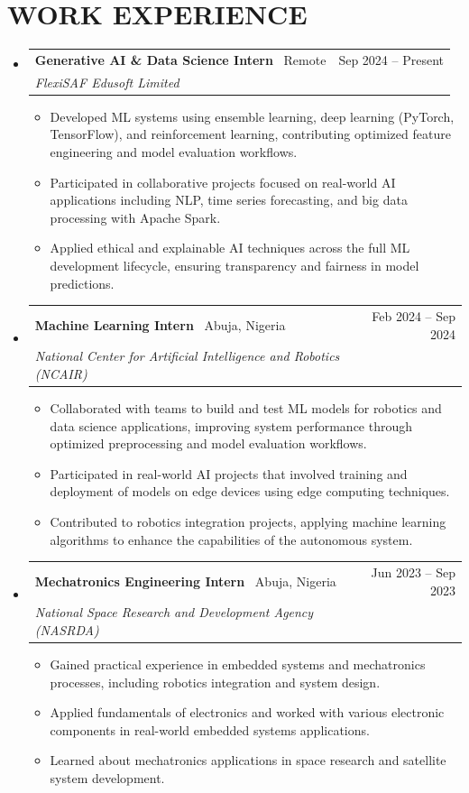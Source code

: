 \documentclass[11pt,a4paper]{article}
\makeatletter
\newcommand{\resumeSubheading}[5]{
  \vspace{2pt}
  \item[]
    \begin{tabular*}{\textwidth}[t]{l@{\extracolsep{\fill}}r}
      \textbf{#1} \textnormal{ \textbar\ #4} & #2 \\ %
      \textit{#3} & \\ %
    \end{tabular*}
    #5
  \vspace{-8pt}
}
\makeatother
\begin{document}
\vspace{-8pt}

\section{WORK EXPERIENCE}

\begin{itemize}[leftmargin=0pt, label={}]

\resumeSubheading
  {Generative AI \& Data Science Intern}{Sep 2024 -- Present}
  {FlexiSAF Edusoft Limited}{Remote}
  {
  \begin{itemize}[leftmargin=15pt, label=\textbullet]
    \item Developed ML systems using ensemble learning, deep learning (PyTorch, TensorFlow), and reinforcement learning, contributing optimized feature engineering and model evaluation workflows.
    \item Participated in collaborative projects focused on real-world AI applications including NLP, time series forecasting, and big data processing with Apache Spark.
    \item Applied ethical and explainable AI techniques across the full ML development lifecycle, ensuring transparency and fairness in model predictions.
  \end{itemize}
  }

\resumeSubheading
  {Machine Learning Intern}{Feb 2024 -- Sep 2024}
  {National Center for Artificial Intelligence and Robotics (NCAIR)}{Abuja, Nigeria}
  {
  \begin{itemize}[leftmargin=15pt, label=\textbullet]
    \item Collaborated with teams to build and test ML models for robotics and data science applications, improving system performance through optimized preprocessing and model evaluation workflows.
    \item Participated in real-world AI projects that involved training and deployment of models on edge devices using edge computing techniques.
    \item Contributed to robotics integration projects, applying machine learning algorithms to enhance the capabilities of the autonomous system.
  \end{itemize}
  }

\resumeSubheading
  {Mechatronics Engineering Intern}{Jun 2023 -- Sep 2023}
  {National Space Research and Development Agency (NASRDA)}{Abuja, Nigeria}
  {
  \begin{itemize}[leftmargin=15pt, label=\textbullet]
    \item Gained practical experience in embedded systems and mechatronics processes, including robotics integration and system design.
    \item Applied fundamentals of electronics and worked with various electronic components in real-world embedded systems applications.
    \item Learned about mechatronics applications in space research and satellite system development.
  \end{itemize}
  }


\end{itemize}
\end{document}

